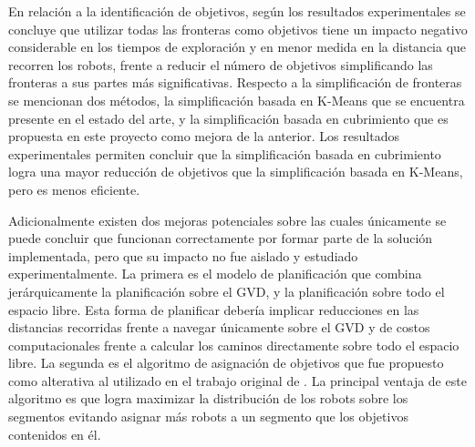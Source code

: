 En relación a la identificación de objetivos, según los resultados
experimentales se concluye que utilizar todas las fronteras como objetivos
tiene un impacto negativo considerable en los tiempos de exploración y en menor
medida en la distancia que recorren los robots, frente a reducir el número de
objetivos simplificando las fronteras a sus partes más significativas.
Respecto a la simplificación de fronteras se mencionan dos métodos, la
simplificación basada en K-Means que se encuentra presente en el estado del
arte, y la simplificación basada en cubrimiento que es propuesta en este proyecto como
mejora de la anterior. Los resultados experimentales permiten concluir que la
simplificación basada en cubrimiento logra una mayor reducción de objetivos que
la simplificación basada en K-Means, pero es menos eficiente.

Adicionalmente existen dos mejoras potenciales sobre las cuales únicamente se
puede concluir que funcionan correctamente por formar parte de la solución
implementada, pero que su impacto no fue aislado y estudiado experimentalmente.
La primera es el modelo de planificación que combina jerárquicamente la
planificación sobre el GVD, y la planificación sobre todo el espacio libre.
Esta forma de planificar debería implicar reducciones en las distancias
recorridas frente a navegar únicamente sobre el GVD y de costos computacionales
frente a calcular los caminos directamente sobre todo el espacio libre. La
segunda es el algoritmo de asignación de objetivos que fue propuesto como
alterativa al utilizado en el trabajo original de \cite{wurm2008coordinated}.
La principal ventaja de este algoritmo es que logra maximizar la distribución
de los robots sobre los segmentos evitando asignar más robots a un segmento que
los objetivos contenidos en él.




